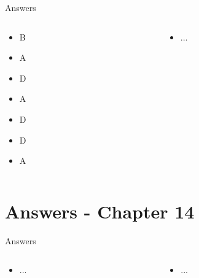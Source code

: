 \documentclass{beamer}
\begin{document}
\begin{frame}{Answers}
\small
\begin{columns}[T]
\begin{column}{0.5\textwidth}
\begin{itemize}
\item B
\item A
\item D
\item A
\item D
\item D
\item A
\end{itemize}
\end{column}
\begin{column}{0.5\textwidth}
\begin{itemize}
\item ...
\end{itemize}
\end{column}
\end{columns}
\end{frame}

\section{Answers - Chapter 14}

\begin{frame}{Answers}
\small
\begin{columns}[T]
\begin{column}{0.5\textwidth}
\begin{itemize}
\item ...
\end{itemize}
\end{column}
\begin{column}{0.5\textwidth}
\begin{itemize}
\item ...
\end{itemize}
\end{column}
\end{columns}
\end{frame}
\end{document}
